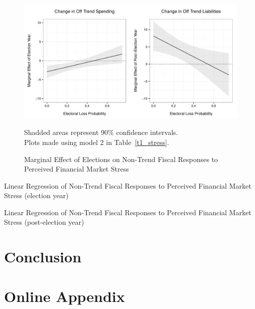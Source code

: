 \documentclass[]{article}
\begin{document}
\begin{figure}
    \caption{Marginal Effect of Elections on Non-Trend Fiscal Responses to Perceived Financial Market Stress}
    \label{me_stress}

    \begin{center}
        \includegraphics[scale=0.7]{analysis/figures/me_stress.pdf}
    \end{center}

    {\scriptsize{Shadded areas represent 90\% confidence intervals. \\
    Plots made using model 2 in Table~\ref{t1_stress}.}}

\end{figure}

\begin{table}
    \caption{Linear Regression of Non-Trend Fiscal Responses to Perceived Financial Market Stress (election year)}
    \label{t0_stress}

    \begin{center}
        
    \end{center}

\end{table}

\begin{table}
    \caption{Linear Regression of Non-Trend Fiscal Responses to Perceived Financial Market Stress (post-election year)}
    \label{t1_stress}

    \begin{center}
        
    \end{center}

\end{table}


\section*{Conclusion}







\section{Online Appendix}


\end{document}
